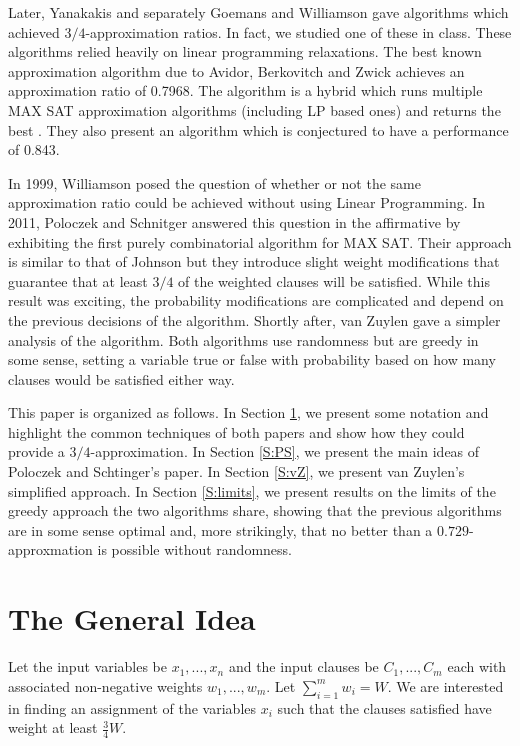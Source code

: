 \documentclass[11pt,letter]{article}
\numberwithin{theorem}{section}
\begin{document}
Later, Yanakakis \cite{Yannakakis1994475} and separately Goemans and Williamson \cite{Goemans94new3/4-approximation}
gave algorithms which achieved $3/4$-approximation ratios. In fact, we studied one of these in class.
These algorithms relied heavily on linear programming relaxations. The best known approximation algorithm due to Avidor, Berkovitch
and Zwick achieves an approximation ratio of 0.7968. The algorithm is a hybrid which runs multiple MAX SAT approximation algorithms
(including LP based ones) and returns the best \cite{Avidor:2005:IAA:2105211.2105214}. They also present an algorithm which is conjectured to have a performance of 0.843. 

In 1999, Williamson posed the question
of whether or not the same approximation ratio could be achieved without using Linear Programming. In 2011,
Poloczek and Schnitger \cite{Poloczek:2011:RVJ:2133036.2133087} answered this question in the affirmative
by exhibiting the first purely combinatorial algorithm for MAX SAT. Their approach is similar to that of Johnson
but they introduce slight weight modifications that guarantee that at least $3/4$ of the weighted clauses will be satisfied.
While this result was exciting, the probability modifications are complicated and depend on the previous decisions
of the algorithm. Shortly after, van Zuylen \cite{vanZuylen:2011:SAM:2238496.2238512} gave a simpler analysis of the algorithm.
Both algorithms use randomness but are greedy in some sense,
setting a variable true or false with probability based on
how many clauses would be satisfied either way.

This paper is organized as follows.
In Section \ref{S:idea}, we present some notation and highlight the common techniques of both papers
and show how they could provide a $3/4$-approximation.
In Section \ref{S:PS}, we present the main ideas of Poloczek and Schtinger's paper.
In Section \ref{S:vZ}, we present van Zuylen's simplified approach.
In Section \ref{S:limits}, we present results on the limits of
the greedy approach the two algorithms share,
showing that the previous algorithms are in some sense optimal
and, more strikingly,
that no better than a $0.729$-approxmation is possible without randomness.


\section{The General Idea}\label{S:idea}

Let the input variables be $x_1,...,x_n$ and the input clauses be $C_1,...,C_m$
each with associated non-negative weights $w_1,...,w_m$. Let $\sum_{i=1}^{m} w_i = W$.
We are interested in finding an assignment of the variables $x_i$ such that the clauses satisfied have weight at least $\frac{3}{4}W$.
\end{document}
